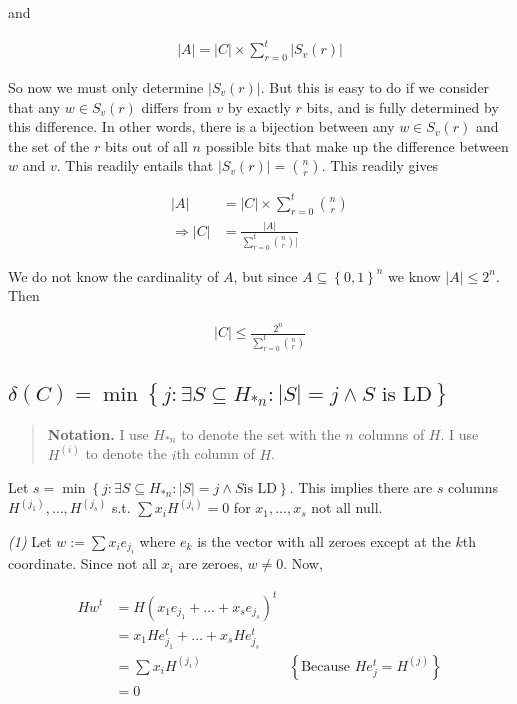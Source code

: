 \documentclass[a4paper]{article}
\begin{document}
and 

\begin{align*}
    |A| = |C| \times \sum_{r=0}^{t} |S_v(r)|
\end{align*}

So now we must only determine $|S_v(r)|$. But this is easy to do if we consider
that any $w \in S_v(r)$ differs from $v$ by exactly $r$ bits, and is fully
determined by this difference. In other words, there is a bijection between any
$w \in S_v(r)$ and the set of the $r$ bits out of all $n$ possible bits that
make up the difference between $w$ and $v$. This readily entails that $|S_v(r)|
= \binom{n}{r}$. This readily gives 

\begin{align*}
    |A| &= |C| \times \sum_{r=0}^{t} \binom{n}{r} \\ 
    \Rightarrow |C| &= \frac{|A|}{\sum_{r=0}^{t} \binom{n}{r} |}
\end{align*}

We do not know the cardinality of $A$, but since $A \subseteq \left\{ 0, 1 \right\}^n $
we know $|A| \leq 2^n$. Then

\begin{align*}
    |C| \leq \frac{2^n}{\sum_{r=0}^{t} \binom{n}{r}}
\end{align*}


\pagebreak


\subsection{$\delta(C) = \min \left\{ j : \exists S \subseteq H_{*n} : |S| = j \land  S \text{ is LD} \right\} $}

\begin{quote}
    \textbf{Notation.} I use $H_{*n}$ to denote the set with the $n$ columns
    of $H$. I use $H^{(i)}$ to denote the $i$th column of $H$.
\end{quote}

Let $s = \min \left\{ j : \exists S \subseteq H_{*n} : |S| = j \land  S \text{
is LD} \right\} $. This implies there are $s$ columns $H^{(j_1)}, \ldots,
H^{(j_s)}$ s.t. $\sum x_i H^{( j_i )} = 0$ for $x_1, \ldots, x_s$ not all null.

\textit{(1)} Let $w := \sum x_i e_{j_i}$ where $e_{k}$ is the vector with all
zeroes except at the $k$th coordinate. Since not all $x_i$ are zeroes, $w \neq
0$. Now, 

\begin{align*}
    Hw^t &= H \left( x_1 e_{j_1} + \ldots + x_s e_{j_s} \right)^t \\ 
         &= x_1 H e_{j_1}^t + \ldots + x_s H e_{j_s}^t \\ 
         &= \sum x_i H^{(j_i)} &\left\{ \text{Because } He_j^t = H^{(j)} \right\}  \\ 
         &= 0
\end{align*}
\end{document}
